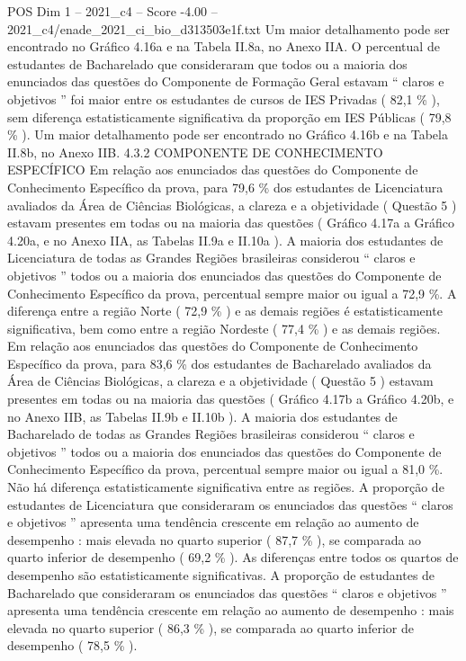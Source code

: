 \begin{textsample}{POS Dim 1 – 2021\_c4 – Score -4.00 – 2021\_c4/enade\_2021\_ci\_bio\_d313503e1f.txt}
Um maior detalhamento pode ser encontrado no Gráfico 4.16a e na Tabela II.8a, no Anexo IIA.
O percentual de estudantes de Bacharelado que consideraram que todos ou a maioria dos enunciados das questões do Componente de Formação Geral estavam “ claros e objetivos ” foi maior entre os estudantes de cursos de IES Privadas ( 82,1 \% ), sem diferença estatisticamente significativa da proporção em IES Públicas ( 79,8 \% ).
Um maior detalhamento pode ser encontrado no Gráfico 4.16b e na Tabela II.8b, no Anexo IIB. 4.3.2 COMPONENTE DE CONHECIMENTO ESPECÍFICO Em relação aos enunciados das questões do Componente de Conhecimento Específico da prova, para 79,6 \% dos estudantes de Licenciatura avaliados da Área de Ciências Biológicas, a clareza e a objetividade ( Questão 5 ) estavam presentes em todas ou na maioria das questões ( Gráfico 4.17a a Gráfico 4.20a, e no Anexo IIA, as Tabelas II.9a e II.10a ).
A maioria dos estudantes de Licenciatura de todas as Grandes Regiões brasileiras considerou “ claros e objetivos ” todos ou a maioria dos enunciados das questões do Componente de Conhecimento Específico da prova, percentual sempre maior ou igual a 72,9 \%.
A diferença entre a região Norte ( 72,9 \% ) e as demais regiões é estatisticamente significativa, bem como entre a região Nordeste ( 77,4 \% ) e as demais regiões.
Em relação aos enunciados das questões do Componente de Conhecimento Específico da prova, para 83,6 \% dos estudantes de Bacharelado avaliados da Área de Ciências Biológicas, a clareza e a objetividade ( Questão 5 ) estavam presentes em todas ou na maioria das questões ( Gráfico 4.17b a Gráfico 4.20b, e no Anexo IIB, as Tabelas II.9b e II.10b ).
A maioria dos estudantes de Bacharelado de todas as Grandes Regiões brasileiras considerou “ claros e objetivos ” todos ou a maioria dos enunciados das questões do Componente de Conhecimento Específico da prova, percentual sempre maior ou igual a 81,0 \%.
Não há diferença estatisticamente significativa entre as regiões.
A proporção de estudantes de Licenciatura que consideraram os enunciados das questões “ claros e objetivos ” apresenta uma tendência crescente em relação ao aumento de desempenho : mais elevada no quarto superior ( 87,7 \% ), se comparada ao quarto inferior de desempenho ( 69,2 \% ).
As diferenças entre todos os quartos de desempenho são estatisticamente significativas.
A proporção de estudantes de Bacharelado que consideraram os enunciados das questões “ claros e objetivos ” apresenta uma tendência crescente em relação ao aumento de desempenho : mais elevada no quarto superior ( 86,3 \% ), se comparada ao quarto inferior de desempenho ( 78,5 \% ).

\end{textsample}
